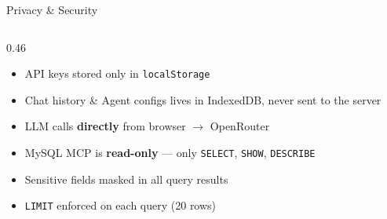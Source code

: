 \documentclass[aspectratio=169, 10pt]{beamer}
\begin{document}
\begin{frame}{Privacy \& Security}
  \begin{columns}[T]
    \begin{column}{0.46\textwidth}
      \begin{tcolorbox}[featurebox, title={\faLaptop\ \ Client-side guarantees}]
        \scriptsize
        \begin{itemize}
          \setlength\itemsep{3pt}
          \item API keys stored only in \texttt{localStorage}
          \item Chat history \& Agent configs lives in IndexedDB, never sent to the server
          \item LLM calls \textbf{directly} from browser $\to$ OpenRouter
        \end{itemize}
      \end{tcolorbox}

      \vspace{0.5em}

      \begin{tcolorbox}[featurebox, title={\faServer\ \ Server-side guarantees}]
        \scriptsize
        \begin{itemize}
          \setlength\itemsep{3pt}
          \item MySQL MCP is \textbf{read-only} — only \texttt{SELECT}, \texttt{SHOW}, \texttt{DESCRIBE}
          \item Sensitive fields masked in all query results
          \item \texttt{LIMIT} enforced on each query (20 rows)
        \end{itemize}
      \end{tcolorbox}
    \end{column}


\end{columns}
\end{frame}
\end{document}
